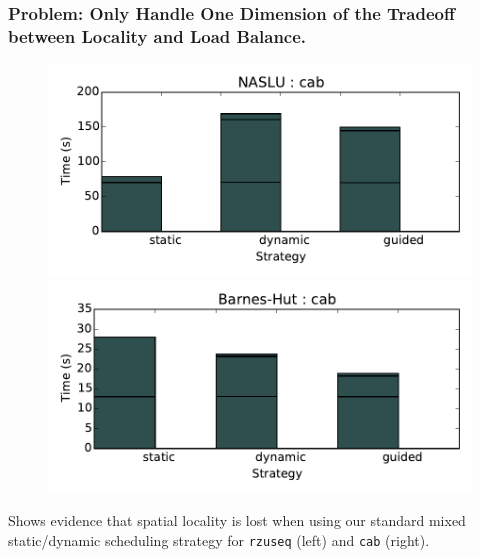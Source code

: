\begin{frame}
\frametitle{Problem: Only Handle One Dimension of the Tradeoff between Locality and Load Balance.}

\begin{figure}[ht!]
\begin{center}
\includegraphics[scale=0.26]{plots/baseline-NASLU-cab-wallTime.pdf}\includegraphics[scale=0.26]{plots/baseline-nbody-cab-wallTime.pdf}
\end{center}
\end{figure}

\begin{center}
{\small Shows evidence that spatial locality is lost when using our standard mixed static/dynamic scheduling strategy for {\tt rzuseq} (left) and \texttt{cab} (right).}
\end{center}
\end{frame}

